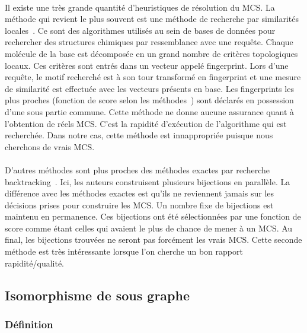 \documentclass[12pt,french,twoside]{report}
\begin{document}
\paragraph{}Il existe une très grande quantité d'heuristiques de résolution du MCS.
La méthode qui revient le plus souvent est une méthode de recherche par similarités locales~\cite{yan_substructure_2005,willett_similarity_2011}.
Ce sont des algorithmes utilisés au sein de bases de données pour rechercher des structures chimiques par ressemblance avec une requête.
Chaque molécule de la base est décomposée en un grand nombre de critères topologiques locaux.
Ces critères sont entrés dans un vecteur appelé fingerprint.
Lors d'une requête, le motif recherché est à son tour transformé en fingerprint et une mesure de similarité est effectuée avec les vecteurs présents en base.
Les fingerprints les plus proches (fonction de score selon les méthodes~\cite{maggiora_molecular_2011,ndiaye_cp_2011}) sont déclarés en possession d'une sous partie commune.
Cette méthode ne donne aucune assurance quant à l'obtention de réels MCS.
C'est la rapidité d'exécution de l'algorithme qui est recherchée.
Dans notre cas, cette méthode est innappropriée puisque nous cherchons de vrais MCS.

\paragraph{}D'autres méthodes sont plus proches des méthodes exactes par recherche backtracking~\cite{grosso_simple_2008, wang_fmcsr:_2013}.
Ici, les auteurs construisent plusieurs bijections en parallèle.
La différence avec les méthodes exactes est qu'ils ne reviennent jamais sur les décisions prises pour construire les MCS.
Un nombre fixe de bijections est maintenu en permanence.
Ces bijections ont été sélectionnées par une fonction de score comme étant celles qui avaient le plus de chance de mener à un MCS.
Au final, les bijections trouvées ne seront pas forcément les vrais MCS.
Cette seconde méthode est très intéressante lorsque l'on cherche un bon rapport rapidité/qualité.


\subsection{Isomorphisme de sous graphe}

\label{SI_p}

\subsubsection{Définition}
\end{document}
